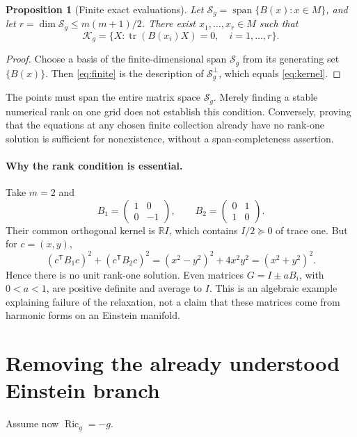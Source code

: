 \documentclass[11pt]{article}
\newtheorem{proposition}{Proposition}[section]
\theoremstyle{remark}\newtheorem{remark}[proposition]{Remark}
\newcommand{\Ric}{\operatorname{Ric}}
\newcommand{\tr}{\operatorname{tr}}
\newcommand{\Span}{\operatorname{span}}
\newcommand{\KK}{\mathcal K_g}
\begin{document}
\begin{proposition}[Finite exact evaluations]
Let $\mathcal S_g=\Span\{B(x):x\in M\}$, and let $r=\dim\mathcal S_g\le m(m+1)/2$. There exist $x_1,\ldots,x_r\in M$ such that
\begin{equation}
 \KK=\{X:\tr(B(x_i)X)=0,\quad i=1,\ldots,r\}.
 \label{eq:finite}
\end{equation}
\end{proposition}
\begin{proof}
Choose a basis of the finite-dimensional span $\mathcal S_g$ from its generating set $\{B(x)\}$. Then \eqref{eq:finite} is the description of $\mathcal S_g^\perp$, which equals \eqref{eq:kernel}.
\end{proof}
The points must span the entire matrix space $\mathcal S_g$. Merely finding a stable numerical rank on one grid does not establish this condition. Conversely, proving that the equations at any chosen finite collection already have no rank-one solution is sufficient for nonexistence, without a span-completeness assertion.

\paragraph{Why the rank condition is essential.}
Take $m=2$ and
\[
 B_1=\begin{pmatrix}1&0\\0&-1\end{pmatrix},\qquad
 B_2=\begin{pmatrix}0&1\\1&0\end{pmatrix}.
\]
Their common orthogonal kernel is $\mathbb RI$, which contains $I/2\succeq0$ of trace one. But for $c=(x,y)$,
\[
 (c^{\mathsf T}B_1c)^2+(c^{\mathsf T}B_2c)^2
 =(x^2-y^2)^2+4x^2y^2=(x^2+y^2)^2.
\]
Hence there is no unit rank-one solution. Even matrices $G=I\pm aB_i$, with $0<a<1$, are positive definite and average to $I$. This is an algebraic example explaining failure of the relaxation, not a claim that these matrices come from harmonic forms on an Einstein manifold.

\section{Removing the already understood Einstein branch}
Assume now $\Ric_g=-g$.
\end{document}
